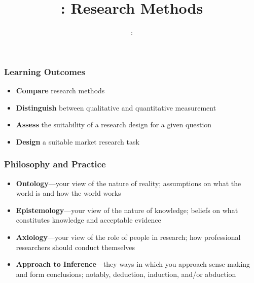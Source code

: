 \usepackage{../../beamerthemeFalmouthGamesAcademy}
\usepackage{multimedia}
\graphicspath{ {../../} }


\usepackage[normalem]{ulem}
\usepackage{wasysym}

\usepackage{pdfpages}

\usetikzlibrary{arrows,automata}







\title{\sessionnumber: Research Methods}
\subtitle{\modulecode: \moduletitle}

\frame{\titlepage} 

\begin{frame}
	\frametitle{Learning Outcomes}
	\begin{itemize}
		\item \textbf{Compare} research methods
		\item \textbf{Distinguish} between qualitative and quantitative measurement
		\item \textbf{Assess} the suitability of a research design for a given question
		\item \textbf{Design} a suitable market research task
	\end{itemize}
\end{frame}


\begin{frame}
	\frametitle{Philosophy and Practice}
	\begin{itemize}
		\item \textbf{Ontology}---your view of the nature of reality; assumptions on what the world is and how the world works
		\item \textbf{Epistemology}---your view of the nature of knowledge; beliefs on what constitutes knowledge and acceptable evidence
		\item \textbf{Axiology}---your view of the role of people in research; how professional researchers should conduct themselves
		\item \textbf{Approach to Inference}---they ways in which you approach sense-making and form conclusions; notably, deduction, induction, and/or abduction
	\end{itemize}
\end{frame}

